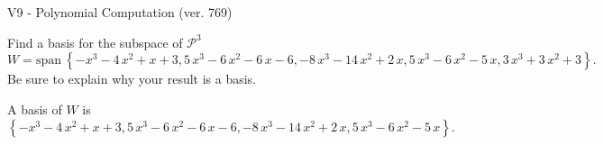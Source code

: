\begin{exercise}
  \begin{exerciseTitle}V9 - Polynomial Computation (ver. 769)\end{exerciseTitle}
  \begin{exerciseStatement}
    Find a basis for the subspace of \(\mathcal{P}^3\) 
\[W=\mathrm{span}\ \left\{-x^{3} - 4 \, x^{2} + x + 3 , 5 \, x^{3} - 6 \, x^{2} - 6 \, x - 6 , -8 \, x^{3} - 14 \, x^{2} + 2 \, x , 5 \, x^{3} - 6 \, x^{2} - 5 \, x , 3 \, x^{3} + 3 \, x^{2} + 3\right\}.\]
 Be sure to explain why your result is a basis.


  \end{exerciseStatement}
  \begin{exerciseAnswer}
   A basis of \(W\) is  \(\left\{-x^{3} - 4 \, x^{2} + x + 3 , 5 \, x^{3} - 6 \, x^{2} - 6 \, x - 6 , -8 \, x^{3} - 14 \, x^{2} + 2 \, x , 5 \, x^{3} - 6 \, x^{2} - 5 \, x\right\}\).
  


  \end{exerciseAnswer}
\end{exercise}